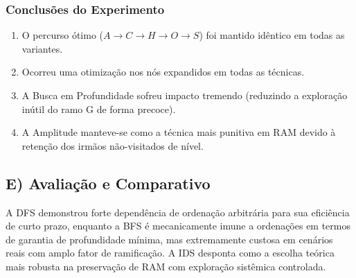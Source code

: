 \subsubsection*{Conclusões do Experimento}
\begin{enumerate}[label=\roman*)]
    \item O percurso ótimo ($A \rightarrow C \rightarrow H \rightarrow O \rightarrow S$) foi mantido idêntico em todas as variantes.
    \item Ocorreu uma otimização nos nós expandidos em todas as técnicas.
    \item A Busca em Profundidade sofreu impacto tremendo (reduzindo a exploração inútil do ramo G de forma precoce).
    \item A Amplitude manteve-se como a técnica mais punitiva em RAM devido à retenção dos irmãos não-visitados de nível.
\end{enumerate}

\subsection*{E) Avaliação e Comparativo}

A DFS demonstrou forte dependência de ordenação arbitrária para sua eficiência de curto prazo, enquanto a BFS é mecanicamente imune a ordenações em termos de garantia de profundidade mínima, mas extremamente custosa em cenários reais com amplo fator de ramificação. A IDS desponta como a escolha teórica mais robusta na preservação de RAM com exploração sistêmica controlada.

